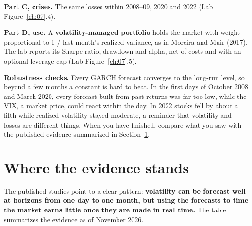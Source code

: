\textbf{Part C, crises.} The same losses within 2008--09, 2020 and 2022 (Lab Figure~\ref{ch:07}.4).

\textbf{Part D, use.} A \textbf{volatility-managed portfolio} holds the market with weight proportional to 1 / last month's realized variance, as in Moreira and Muir (2017). The lab reports its Sharpe ratio, drawdown and alpha, net of costs and with an optional leverage cap (Lab Figure~\ref{ch:07}.5).

\label{sec:10-stress}
\textbf{Robustness checks.} Every GARCH forecast converges to the long-run level, so beyond a few months a constant is hard to beat. In the first days of October 2008 and March 2020, every forecast built from past returns was far too low, while the VIX, a market price, could react within the day. In 2022 stocks fell by about a fifth while realized volatility stayed moderate, a reminder that volatility and losses are different things. When you have finished, compare what you saw with the published evidence summarized in Section~\ref{sec:10-verdict}.

\section{Where the evidence stands}
\label{sec:10-verdict}

The published studies point to a clear pattern: \textbf{volatility can be forecast well at horizons from one day to one month, but using the forecasts to time the market earns little once they are made in real time.} The table summarizes the evidence as of November 2026.

